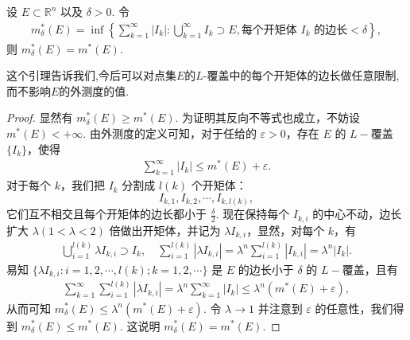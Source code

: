 \documentclass[../../main.tex]{subfiles}%
\begin{document}
\begin{lemma}
设 \(E \subset \mathbb{R}^n\) 以及 \(\delta > 0\). 令
\begin{align*}
m^*_{\delta}(E) = \inf\left\{ \sum_{k = 1}^{\infty} |I_k| : \bigcup_{k = 1}^{\infty} I_k \supset E, \text{每个开矩体 } I_k \text{ 的边长} < \delta \right\},
\end{align*}
则 \(m^*_{\delta}(E)=m^*(E)\).
\end{lemma}
\begin{note}
这个引理告诉我们,今后可以对点集$E$的$L$-覆盖中的每个开矩体的边长做任意限制,而不影响$E$的外测度的值.
\end{note}
\begin{proof}
显然有 \(m^*_{\delta}(E) \geqslant  m^*(E)\). 为证明其反向不等式也成立，不妨设 \(m^*(E)< + \infty\). 由外测度的定义可知，对于任给的 \(\varepsilon > 0\)，存在 \(E\) 的 \(L -\)覆盖 \(\{I_k\}\)，使得
\begin{align*}
\sum_{k = 1}^{\infty} |I_k| \leqslant  m^*(E) + \varepsilon.
\end{align*}
对于每个 \(k\)，我们把 \(I_k\) 分割成 \(l(k)\) 个开矩体：
\[
I_{k,1}, I_{k,2}, \cdots, I_{k,l(k)},
\]
它们互不相交且每个开矩体的边长都小于 \(\frac{\delta}{2}\). 现在保持每个 \(I_{k,i}\) 的中心不动，边长扩大 \(\lambda(1 < \lambda < 2)\) 倍做出开矩体，并记为 \(\lambda I_{k,i}\)，显然，对每个 \(k\)，有
\begin{align*}
\bigcup_{i = 1}^{l(k)} \lambda I_{k,i} \supset I_k, \quad \sum_{i = 1}^{l(k)} |\lambda I_{k,i}| = \lambda^n \sum_{i = 1}^{l(k)} |I_{k,i}| = \lambda^n |I_k|.
\end{align*}
易知 \(\{\lambda I_{k,i} : i = 1,2,\cdots, l(k); k = 1,2,\cdots\}\) 是 \(E\) 的边长小于 \(\delta\) 的 \(L -\)覆盖，且有
\begin{align*}
\sum_{k = 1}^{\infty} \sum_{i = 1}^{l(k)} |\lambda I_{k,i}| = \lambda^n \sum_{k = 1}^{\infty} |I_k| \leqslant  \lambda^n (m^*(E) + \varepsilon),
\end{align*}
从而可知 \(m^*_{\delta}(E) \leqslant  \lambda^n (m^*(E) + \varepsilon)\). 令 \(\lambda \to 1\) 并注意到 \(\varepsilon\) 的任意性，我们得到 \(m^*_{\delta}(E) \leqslant  m^*(E)\). 这说明 \(m^*_{\delta}(E)=m^*(E)\).
\end{proof}
\end{document}
